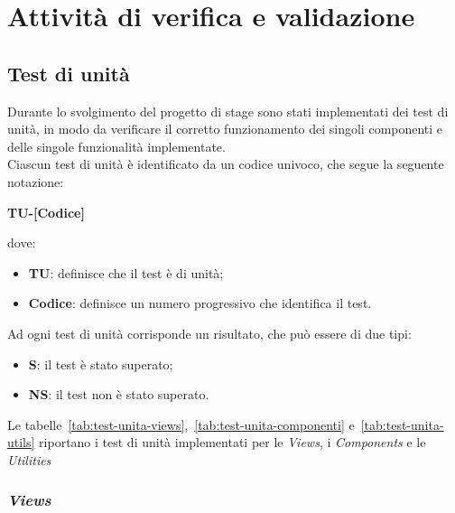 \chapter{Attività di verifica e validazione}\label{cap:verifica-validazione}


\section{Test di unità}\label{sec:test-unita}
Durante lo svolgimento del progetto di stage sono stati implementati dei test di unità, in modo da verificare il corretto funzionamento
dei singoli componenti e delle singole funzionalità implementate.\\
Ciascun test di unità è identificato da un codice univoco, che segue la seguente notazione:
\begin{center}
  \textbf{TU-[Codice]}
\end{center}
dove:
\begin{itemize}
  \item \textbf{TU}: definisce che il test è di unità;
  \item \textbf{Codice}: definisce un numero progressivo che identifica il test.
\end{itemize}
Ad ogni test di unità corrisponde un risultato, che può essere di due tipi:
\begin{itemize}
  \item \textbf{S}: il test è stato superato;
  \item \textbf{NS}: il test non è stato superato.
\end{itemize}
Le tabelle~\ref{tab:test-unita-views},~\ref{tab:test-unita-componenti} e~\ref{tab:test-unita-utils} riportano i test di unità implementati per le \textit{Views}, i \textit{Components} e le \textit{Utilities}\\

\clearpage
\subsection*{\emph{Views}}\label{subsec:test-unita-views}

